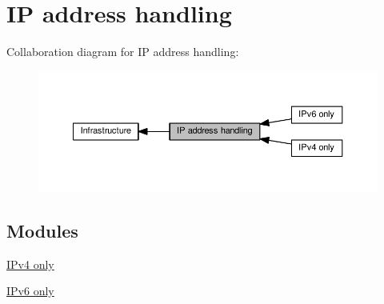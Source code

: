 \hypertarget{group__ipaddr}{}\section{IP address handling}
\label{group__ipaddr}
Collaboration diagram for IP address handling\+:
\nopagebreak
\begin{figure}[H]
\begin{center}
\leavevmode
\includegraphics[width=350pt]{group__ipaddr}
\end{center}
\end{figure}
\subsection*{Modules}
\begin{DoxyCompactItemize}
\item 
\hyperlink{group__ip4addr}{I\+Pv4 only}
\item 
\hyperlink{group__ip6addr}{I\+Pv6 only}
\end{DoxyCompactItemize}
